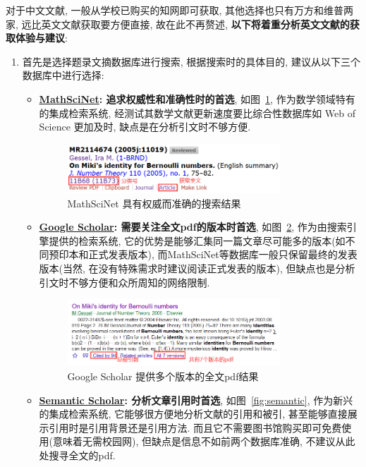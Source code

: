 \documentclass{formatBook}
\begin{document}
对于中文文献, 一般从学校已购买的知网即可获取, 其他选择也只有万方和维普两家, 远比英文文献获取要方便直接, 故在此不再赘述, \textbf{以下将着重分析英文文献的获取体验与建议}:
\begin{enumerate}
    \item 首先是选择题录文摘数据库进行搜索, 根据搜索时的具体目的, 建议从以下三个数据库中进行选择:
    \begin{itemize}
        \item \textbf{\href{https://mathscinet.ams.org/mathscinet}{MathSciNet}: 追求权威性和准确性时的首选}, 如图~\ref{fig:mathscinet}, 作为数学领域特有的集成检索系统, 经测试其数学文献更新速度要比综合性数据库如 Web of Science 更加及时, 缺点是在分析引文时不够方便.
        \begin{figure}[H]
            \centering
            \includegraphics[width=0.8\textwidth]{figure/mathscinet.png}
            \caption{MathSciNet 具有权威而准确的搜索结果}
            \label{fig:mathscinet}
        \end{figure}
        \item \textbf{\href{https://scholar.google.com/}{Google Scholar}: 需要关注全文pdf的版本时首选}, 如图~\ref{fig:googlesch}, 作为由搜索引擎提供的检索系统, 它的优势是能够汇集同一篇文章尽可能多的版本(如不同预印本和正式发表版本), 而MathSciNet等数据库一般只保留最终的发表版本(当然, 在没有特殊需求时建议阅读正式发表的版本), 但缺点也是分析引文时不够方便和众所周知的网络限制.
        \begin{figure}[H]
            \centering
            \includegraphics[width=0.8\textwidth]{figure/googlescholar.png}
            \caption{Google Scholar 提供多个版本的全文pdf结果}
            \label{fig:googlesch}
        \end{figure}
        \item \textbf{\href{https://www.semanticscholar.org/}{Semantic Scholar}: 分析文章引用时首选}, 如图~\ref{fig:semantic}, 作为新兴的集成检索系统, 它能够很方便地分析文献的引用和被引, 甚至能够直接展示引用时是引用背景还是引用方法. 而且它不需要图书馆购买即可免费使用(意味着无需校园网), 但缺点是信息不如前两个数据库准确, 不建议从此处搜寻全文的pdf. 

\end{itemize}
\end{enumerate}
\end{document}
